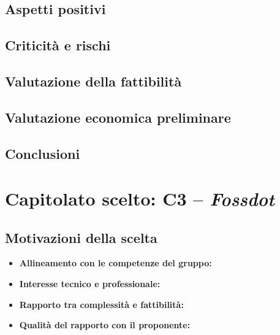 \documentclass[12pt,a4paper]{article}
\begin{document}
\subsection{Aspetti positivi}

\subsection{Criticità e rischi}

\subsection{Valutazione della fattibilità}

\subsection{Valutazione economica preliminare}

\subsection{Conclusioni}


\section{Capitolato scelto: C3 -- \emph{Fossdot}}

\subsection{Motivazioni della scelta}
\begin{itemize}
\item \textbf{Allineamento con le competenze del gruppo:} 
\item \textbf{Interesse tecnico e professionale:} 
\item \textbf{Rapporto tra complessità e fattibilità:} 
\item \textbf{Qualità del rapporto con il proponente:} 
\end{itemize}
\end{document}
